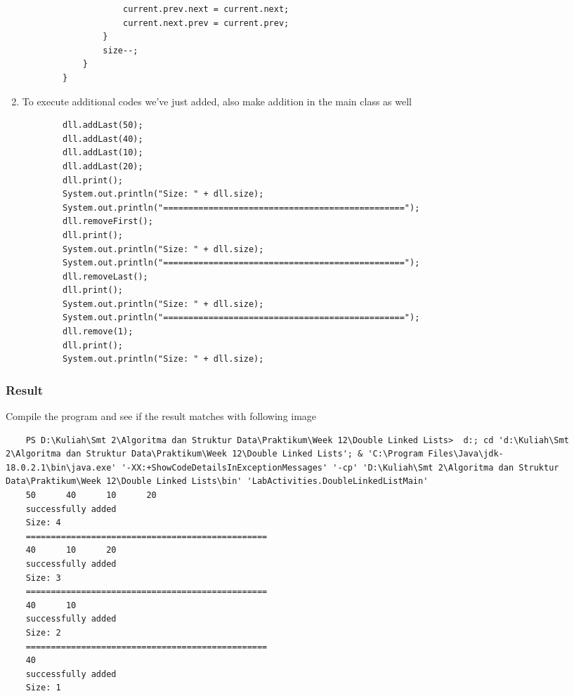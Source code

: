 \documentclass[12pt,titlepage]{article}
\begin{document}
\begin{enumerate}
\begin{verbatim}
                    current.prev.next = current.next;
                    current.next.prev = current.prev;
                }
                size--;
            }
        }
    \end{verbatim}
    \item To execute additional codes we’ve just added, also make addition in the main class as well
    \begin{verbatim}
        dll.addLast(50);
        dll.addLast(40);
        dll.addLast(10);
        dll.addLast(20);
        dll.print();
        System.out.println("Size: " + dll.size);
        System.out.println("================================================");
        dll.removeFirst();
        dll.print();
        System.out.println("Size: " + dll.size);
        System.out.println("================================================");
        dll.removeLast();
        dll.print();
        System.out.println("Size: " + dll.size);
        System.out.println("================================================");
        dll.remove(1);
        dll.print();
        System.out.println("Size: " + dll.size);
    \end{verbatim}
\end{enumerate}

\subsubsection{Result}
Compile the program and see if the result matches with following image
\begin{verbatim}
    PS D:\Kuliah\Smt 2\Algoritma dan Struktur Data\Praktikum\Week 12\Double Linked Lists>  d:; cd 'd:\Kuliah\Smt 2\Algoritma dan Struktur Data\Praktikum\Week 12\Double Linked Lists'; & 'C:\Program Files\Java\jdk-18.0.2.1\bin\java.exe' '-XX:+ShowCodeDetailsInExceptionMessages' '-cp' 'D:\Kuliah\Smt 2\Algoritma dan Struktur Data\Praktikum\Week 12\Double Linked Lists\bin' 'LabActivities.DoubleLinkedListMain' 
    50      40      10      20
    successfully added
    Size: 4
    ================================================
    40      10      20
    successfully added
    Size: 3
    ================================================
    40      10
    successfully added
    Size: 2
    ================================================
    40
    successfully added
    Size: 1
\end{verbatim}
\end{document}
